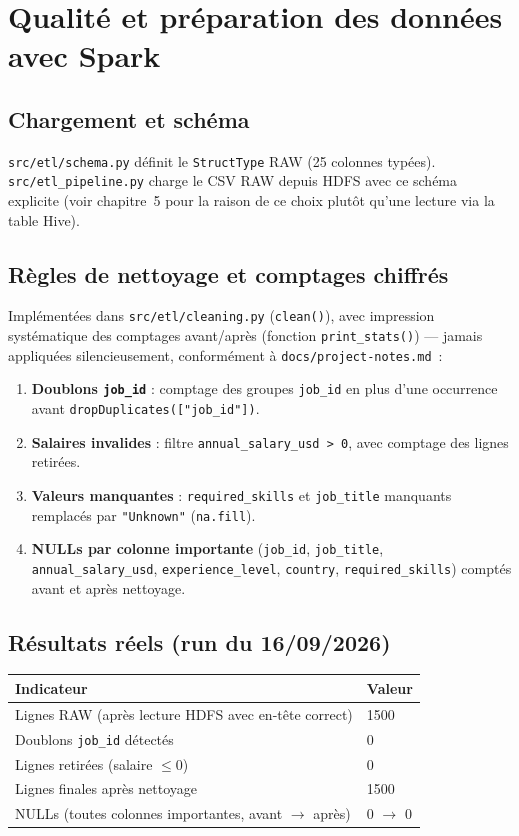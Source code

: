 \chapter{Qualité et préparation des données avec Spark}

\section{Chargement et schéma}

\texttt{src/etl/schema.py} définit le \texttt{StructType} RAW (25
colonnes typées). \texttt{src/etl\_pipeline.py} charge le CSV RAW
depuis HDFS avec ce schéma explicite (voir chapitre~5 pour la raison de
ce choix plutôt qu'une lecture via la table Hive).

\section{Règles de nettoyage et comptages chiffrés}

Implémentées dans \texttt{src/etl/cleaning.py}
(\texttt{clean()}), avec impression systématique des comptages
avant/après (fonction \texttt{print\_stats()}) — jamais appliquées
silencieusement, conformément à \texttt{docs/project-notes.md}~:

\begin{enumerate}[leftmargin=1.5em]
  \item \textbf{Doublons \texttt{job\_id}} : comptage des groupes
    \texttt{job\_id} en plus d'une occurrence avant
    \texttt{dropDuplicates(["job\_id"])}.
  \item \textbf{Salaires invalides} : filtre
    \texttt{annual\_salary\_usd > 0}, avec comptage des lignes
    retirées.
  \item \textbf{Valeurs manquantes} : \texttt{required\_skills} et
    \texttt{job\_title} manquants remplacés par \texttt{"Unknown"}
    (\texttt{na.fill}).
  \item \textbf{NULLs par colonne importante} (\texttt{job\_id},
    \texttt{job\_title}, \texttt{annual\_salary\_usd},
    \texttt{experience\_level}, \texttt{country},
    \texttt{required\_skills}) comptés avant et après nettoyage.
\end{enumerate}

\section{Résultats réels (run du 16/09/2026)}

\begin{center}
\begin{tabular}{ll}
\toprule
Indicateur & Valeur \\
\midrule
Lignes RAW (après lecture HDFS avec en-tête correct) & 1500 \\
Doublons \texttt{job\_id} détectés & 0 \\
Lignes retirées (salaire $\leq 0$) & 0 \\
Lignes finales après nettoyage & 1500 \\
NULLs (toutes colonnes importantes, avant $\to$ après) & 0 $\to$ 0 \\
\bottomrule
\end{tabular}
\end{center}

